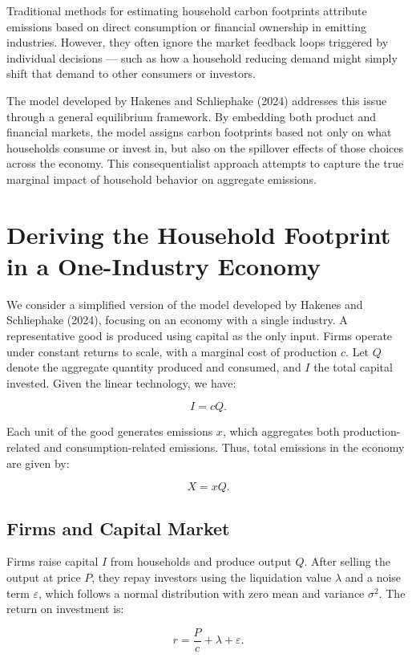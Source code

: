 \documentclass[12pt,a4paper]{article}%
\begin{document}
Traditional methods for estimating household carbon footprints attribute emissions based on direct consumption or financial ownership in emitting industries. However, they often ignore the market feedback loops triggered by individual decisions — such as how a household reducing demand might simply shift that demand to other consumers or investors.

The model developed by Hakenes and Schliephake (2024) addresses this issue through a general equilibrium framework. By embedding both product and financial markets, the model assigns carbon footprints based not only on what households consume or invest in, but also on the spillover effects of those choices across the economy. This consequentialist approach attempts to capture the true marginal impact of household behavior on aggregate emissions.

\section{Deriving the Household Footprint in a One-Industry Economy}

We consider a simplified version of the model developed by Hakenes and Schliephake (2024), focusing on an economy with a single industry. A representative good is produced using capital as the only input. Firms operate under constant returns to scale, with a marginal cost of production $c$. Let $Q$ denote the aggregate quantity produced and consumed, and $I$ the total capital invested. Given the linear technology, we have:

\[
I = cQ.
\]

Each unit of the good generates emissions $x$, which aggregates both production-related and consumption-related emissions. Thus, total emissions in the economy are given by:

\[
X = xQ.
\]

\subsection*{Firms and Capital Market}

Firms raise capital $I$ from households and produce output $Q$. After selling the output at price $P$, they repay investors using the liquidation value $\lambda$ and a noise term $\varepsilon$, which follows a normal distribution with zero mean and variance $\sigma^2$. The return on investment is:

\[
r = \frac{P}{c} + \lambda + \varepsilon.
\]
\end{document}
